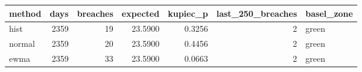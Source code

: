 \begin{tabular}{lrrrrrl}
\toprule
method & days & breaches & expected & kupiec_p & last_250_breaches & basel_zone \\
\midrule
hist & 2359 & 19 & 23.5900 & 0.3256 & 2 & green \\
normal & 2359 & 20 & 23.5900 & 0.4456 & 2 & green \\
ewma & 2359 & 33 & 23.5900 & 0.0663 & 2 & green \\
\bottomrule
\end{tabular}
